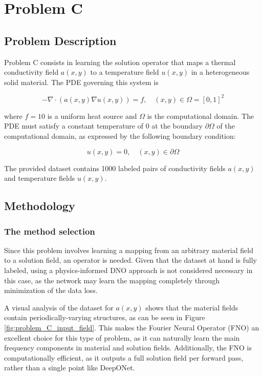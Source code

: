 \chapter{Problem C}
\label{ch:problem_C}
%
\section{Problem Description}
%

Problem C consists in learning the solution operator that maps a thermal conductivity field $a(x, y)$ to a temperature field $u(x, y)$ in a heterogeneous solid material. The PDE governing this system is

\begin{equation}
	-\nabla\cdot\left( a(x,y)\nabla u(x, y) \right) = f, \quad (x,y)\in\Omega = [0,1]^2 
\end{equation}

\noindent
where $f = 10$ is a uniform heat source and $\Omega$ is the computational domain.
The PDE must satisfy a constant temperature of 0 at the boundary $\partial\Omega$ of the computational domain, as expressed by the following boundary condition:

\begin{equation}
	u(x,y) = 0, \quad (x,y)\in\partial\Omega
\end{equation}

The provided dataset contains 1000 labeled pairs of conductivity fields $a(x,y)$ and temperature fields $u(x,y)$.

\section{Methodology}
%
\subsection{The method selection}
%

Since this problem involves learning a mapping from an arbitrary material field to a solution field, an operator is needed. Given that the dataset at hand is fully labeled, using a physics-informed DNO approach is not considered necessary in this case, as the network may learn the mapping completely through minimization of the data loss.

A visual analysis of the dataset for $a(x,y)$ shows that the material fields contain periodically-varying structures, as can be seen in Figure \ref{fig:problem_C_input_field}. This makes the Fourier Neural Operator (FNO) an excellent choice for this type of problem, as it can naturally learn the main frequency components in material and solution fields. Additionally, the FNO is computationally efficient, as it outputs a full solution field per forward pass, rather than a single point like DeepONet.


